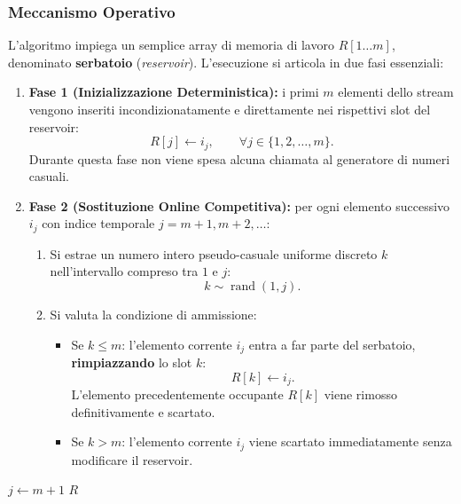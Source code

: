 \subsubsection{Meccanismo Operativo}
L'algoritmo impiega un semplice array di memoria di lavoro $R[1 \dots m]$, denominato \textbf{serbatoio} (\textit{reservoir}). L'esecuzione si articola in due fasi essenziali:
\begin{enumerate}
  \item \textbf{Fase 1 (Inizializzazione Deterministica):} i primi $m$ elementi dello stream vengono inseriti incondizionatamente e direttamente nei rispettivi slot del reservoir:
  \begin{equation}
    R[j] \leftarrow i_j, \qquad \forall j \in \{1, 2, \dots, m\}.
  \end{equation}
  Durante questa fase non viene spesa alcuna chiamata al generatore di numeri casuali.
  \item \textbf{Fase 2 (Sostituzione Online Competitiva):} per ogni elemento successivo $i_j$ con indice temporale $j = m + 1, m + 2, \dots$:
  \begin{enumerate}
    \item Si estrae un numero intero pseudo-casuale uniforme discreto $k$ nell'intervallo compreso tra $1$ e $j$:
    \begin{equation}
      k \sim \operatorname{rand}(1, j).
    \end{equation}
    \item Si valuta la condizione di ammissione:
    \begin{itemize}
      \item Se $k \le m$: l'elemento corrente $i_j$ entra a far parte del serbatoio, \textbf{rimpiazzando} lo slot $k$:
      \begin{equation}
        R[k] \leftarrow i_j.
      \end{equation}
      L'elemento precedentemente occupante $R[k]$ viene rimosso definitivamente e scartato.
      \item Se $k > m$: l'elemento corrente $i_j$ viene scartato immediatamente senza modificare il reservoir.
    \end{itemize}
  \end{enumerate}
\end{enumerate}

\begin{algorithm}[H]
  \caption{Reservoir Sampling (Algoritmo R di Waterman / Knuth)}
  \label{alg:reservoir-sampling-stream}
  $j \leftarrow m + 1$\;
  \Return $R$\;
\end{algorithm}

